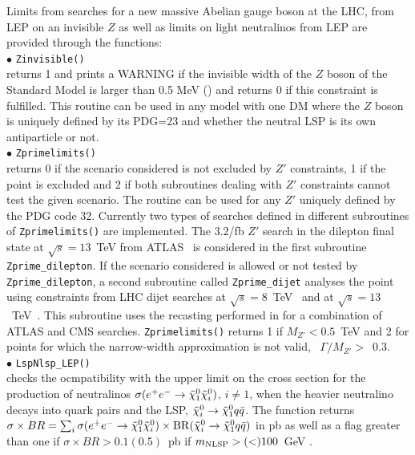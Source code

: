 \documentclass[12pt,a4paper]{article}
\begin{document}
Limits from searches for a new massive Abelian gauge boson at the LHC, from LEP on an invisible $Z$ as well as limits on light neutralinos from LEP are provided through the functions: \\[2mm]
%
\noi$\bullet$ \verb|Zinvisible()|\\
returns 1 and prints a WARNING if the invisible width of the $Z$ boson of the Standard Model 
is larger than 0.5 MeV (\cite{Freitas:2014hra}) and returns 0 if this constraint is fulfilled.
This routine can be used in any model with one DM where the $Z$ boson is  uniquely defined by its PDG=23 and whether the neutral LSP is its own antiparticle or not.\\[2mm]
%
\noi$\bullet$ \verb|Zprimelimits()|\\
returns 0 if the scenario considered is not excluded by $Z'$ constraints, 1 if the point is excluded and 2 if both subroutines dealing with $Z'$ constraints cannot test the given scenario. The routine can be used for any $Z'$ uniquely defined by the PDG code 32.
Currently two types of searches defined in different subroutines of \verb|Zprimelimits()| are implemented.
The $3.2$/fb $Z'$ search in the dilepton final state at $\sqrt{s} = 13$~TeV from ATLAS~\cite{Aaboud:2016cth} is considered in the first subroutine \verb|Zprime_dilepton|. If the scenario considered is allowed or not tested by \verb|Zprime_dilepton|, a second subroutine called \verb|Zprime_dijet| analyses the point using constraints from LHC dijet searches at $\sqrt{s} = 8$~TeV~\cite{Aad:2014aqa,Khachatryan:2015sja,Khachatryan:2016ecr} and at $\sqrt{s} = 13$~TeV~\cite{ATLAS:2015nsi,Khachatryan:2015dcf}. This subroutine uses the recasting  performed  in \cite{Fairbairn:2016iuf} for a combination of ATLAS and CMS searches.
\verb|Zprimelimits()| returns 1 if $M_{Z'}<0.5$~TeV and  2 for points  for which the narrow-width approximation is not valid, \ie~$\Gamma/M_{Z'}>$~0.3.\\[2mm]
%
\noi$\bullet$   \verb|LspNlsp_LEP()|\\
checks  the ocmpatibility with the upper limit \cite{Abbiendi:2003sc} on the cross section for the production of neutralinos 
$\sigma(e^+e^-\rightarrow \tilde\chi^0_1\tilde\chi^0_i)$, $i\neq 1$, when the heavier neutralino decays into quark pairs 
and the LSP, $\tilde\chi^0_i \rightarrow \tilde\chi^0_1 q\bar{q}$. The function  
 returns $\sigma \times BR = \sum_i \sigma(e^+e^-\rightarrow \tilde\chi^0_1\tilde\chi^0_i)\times {\rm BR}(\tilde\chi^0_i \rightarrow \tilde\chi^0_1 q\bar{q})$ in pb as well as a flag greater than one if $\sigma \times BR>0.1(0.5)$~pb if $m_{\rm NLSP}> (<)100$~GeV \cite{Abbiendi:2003sc}. 
\end{document}
